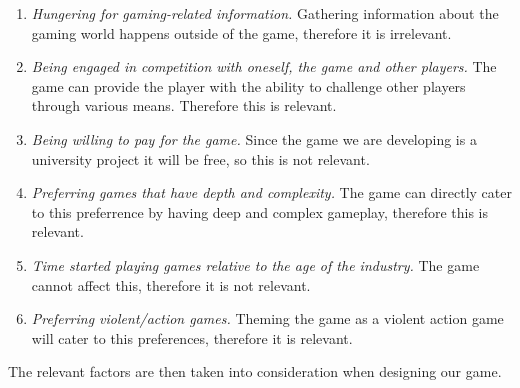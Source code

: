 \begin{enumerate}
\item \emph{Hungering for gaming-related information.}
Gathering information about the gaming world happens outside of the game, therefore it is irrelevant.

\item \emph{Being engaged in competition with oneself, the game and other players.}
The game can provide the player with the ability to challenge other players through various means. Therefore this is relevant.

\item \emph{Being willing to pay for the game.}
Since the game we are developing is a university project it will be free, so this is not relevant.

\item \emph{Preferring games that have depth and complexity.}
The game can directly cater to this preferrence by having deep and complex gameplay, therefore this is relevant.

\item \emph{Time started playing games relative to the age of the industry.}
The game cannot affect this, therefore it is not relevant.

\item \emph{Preferring violent/action games.}
Theming the game as a violent action game will cater to this preferences, therefore it is relevant.
\end{enumerate}

The relevant factors are then taken into consideration when designing our game.

